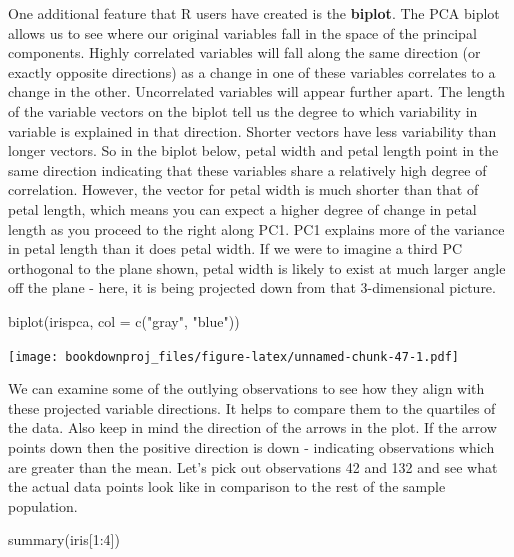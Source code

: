 \documentclass[
]{article}
\newenvironment{Shaded}{\begin{snugshade}}{\end{snugshade}}
\newcommand{\AttributeTok}[1]{\textcolor[rgb]{0.77,0.63,0.00}{#1}}
\newcommand{\DecValTok}[1]{\textcolor[rgb]{0.00,0.00,0.81}{#1}}
\newcommand{\FunctionTok}[1]{\textcolor[rgb]{0.00,0.00,0.00}{#1}}
\newcommand{\NormalTok}[1]{#1}
\newcommand{\SpecialCharTok}[1]{\textcolor[rgb]{0.00,0.00,0.00}{#1}}
\newcommand{\StringTok}[1]{\textcolor[rgb]{0.31,0.60,0.02}{#1}}
\theoremstyle{definition}
\theoremstyle{definition}
\theoremstyle{definition}
\theoremstyle{definition}
\theoremstyle{remark}
\begin{document}
One additional feature that R users have created is the \textbf{biplot}. The PCA biplot allows us to see where our original variables fall in the space of the principal components. Highly correlated variables will fall along the same direction (or exactly opposite directions) as a change in one of these variables correlates to a change in the other. Uncorrelated variables will appear further apart. The length of the variable vectors on the biplot tell us the degree to which variability in variable is explained in that direction. Shorter vectors have less variability than longer vectors. So in the biplot below, petal width and petal length point in the same direction indicating that these variables share a relatively high degree of correlation. However, the vector for petal width is much shorter than that of petal length, which means you can expect a higher degree of change in petal length as you proceed to the right along PC1. PC1 explains more of the variance in petal length than it does petal width. If we were to imagine a third PC orthogonal to the plane shown, petal width is likely to exist at much larger angle off the plane - here, it is being projected down from that 3-dimensional picture.

\begin{Shaded}
\begin{Highlighting}[]
\FunctionTok{biplot}\NormalTok{(irispca, }\AttributeTok{col =} \FunctionTok{c}\NormalTok{(}\StringTok{"gray"}\NormalTok{, }\StringTok{"blue"}\NormalTok{))}
\end{Highlighting}
\end{Shaded}

\texttt{[image: bookdownproj\_files/figure-latex/unnamed-chunk-47-1.pdf]}

We can examine some of the outlying observations to see how they align with these projected variable directions. It helps to compare them to the quartiles of the data. Also keep in mind the direction of the arrows in the plot. If the arrow points down then the positive direction is down - indicating observations which are greater than the mean. Let's pick out observations 42 and 132 and see what the actual data points look like in comparison to the rest of the sample population.

\begin{Shaded}
\begin{Highlighting}[]
\FunctionTok{summary}\NormalTok{(iris[}\DecValTok{1}\SpecialCharTok{:}\DecValTok{4}\NormalTok{])}
\end{Highlighting}
\end{Shaded}
\end{document}
